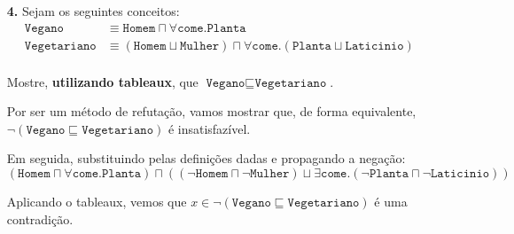 \documentclass[10pt, twoside]{article}          %
\newenvironment{proof*}[1][proof*]              %
  {\proof[#1]\vspace{0.5em}\vspace*{-\baselineskip}
  \hspace{\parindent}\leftskip=.5cm\rightskip=.5cm}
  {\vspace*{-1.5\baselineskip}
  
  \rightskip=0cm\endproof}
\begin{document}
\begin{multicols*}{2}
\begin{enumerate}
  \vfill\null\columnbreak
  \item[\textbf{4.}] Sejam os seguintes conceitos:
  \begin{align*}
    \texttt{Vegano}       &\equiv \texttt{Homem} \sqcap \forall\texttt{come}.\texttt{Planta}        \\
    \texttt{Vegetariano}  &\equiv         (\texttt{Homem} \sqcup \texttt{Mulher}) 
                                  \sqcap  \forall\texttt{come}.(       \texttt{Planta} 
                                                                \sqcup \texttt{Laticinio})          \\
  \end{align*} 

  Mostre, \textbf{utilizando tableaux}, que $\texttt{Vegano}\sqsubseteq\texttt{Vegetariano}$.
  \begin{proof*}[\unskip\nopunct]
    \delimitershortfall=-1pt
    Por ser um método de refutação, vamos mostrar que, de forma equivalente, 
    $\lnot(\texttt{Vegano}\sqsubseteq\texttt{Vegetariano})$ é insatisfazível.

    Em seguida, substituindo pelas definições dadas e propagando a negação:
    \[
              (
                      \texttt{Homem}
              \sqcap
                      \forall\texttt{come}.\texttt{Planta}
              )
      \sqcap
              (
                      (\lnot\texttt{Homem}\sqcap\lnot\texttt{Mulher})
              \sqcup
                      \exists\texttt{come}.(\lnot\texttt{Planta}\sqcap\lnot\texttt{Laticinio})
              )
    \]

    Aplicando o tableaux, vemos que $x\in\lnot(\texttt{Vegano}\sqsubseteq\texttt{Vegetariano})$ é 
    uma contradição.
    \begin{center}
      \footnotesize
\end{center}
\end{proof*}
\end{enumerate}
\end{multicols*}
\end{document}
